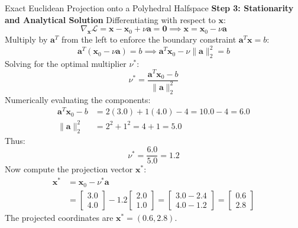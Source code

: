 \begin{examplebox}[breakable]{Exact Euclidean Projection onto a Polyhedral Halfspace}
\textbf{Step 3: Stationarity and Analytical Solution}
Differentiating with respect to $\mathbf{x}$:
\begin{equation}
\nabla_{\mathbf{x}}\mathcal{L} = \mathbf{x} - \mathbf{x}_0 + \nu \mathbf{a} = \mathbf{0} \implies \mathbf{x} = \mathbf{x}_0 - \nu \mathbf{a}
\end{equation}
Multiply by $\mathbf{a}^T$ from the left to enforce the boundary constraint $\mathbf{a}^T \mathbf{x} = b$:
\begin{equation}
\mathbf{a}^T (\mathbf{x}_0 - \nu \mathbf{a}) = b \implies \mathbf{a}^T \mathbf{x}_0 - \nu \|\mathbf{a}\|_2^2 = b
\end{equation}
Solving for the optimal multiplier $\nu^*$:
\begin{equation}
\nu^* = \frac{\mathbf{a}^T \mathbf{x}_0 - b}{\|\mathbf{a}\|_2^2}
\end{equation}
Numerically evaluating the components:
\begin{align}
\mathbf{a}^T \mathbf{x}_0 - b &= 2(3.0) + 1(4.0) - 4 = 10.0 - 4 = 6.0 \\
\|\mathbf{a}\|_2^2 &= 2^2 + 1^2 = 4 + 1 = 5.0
\end{align}
Thus:
\begin{equation}
\nu^* = \frac{6.0}{5.0} = 1.2
\end{equation}
Now compute the projection vector $\mathbf{x}^*$:
\begin{align}
\mathbf{x}^* &= \mathbf{x}_0 - \nu^* \mathbf{a} \nonumber \\
&= \begin{bmatrix} 3.0 \\ 4.0 \end{bmatrix} - 1.2 \begin{bmatrix} 2.0 \\ 1.0 \end{bmatrix}
= \begin{bmatrix} 3.0 - 2.4 \\ 4.0 - 1.2 \end{bmatrix} = \begin{bmatrix} 0.6 \\ 2.8 \end{bmatrix}
\end{align}
The projected coordinates are $\mathbf{x}^* = (0.6, 2.8)$.


\end{examplebox}
